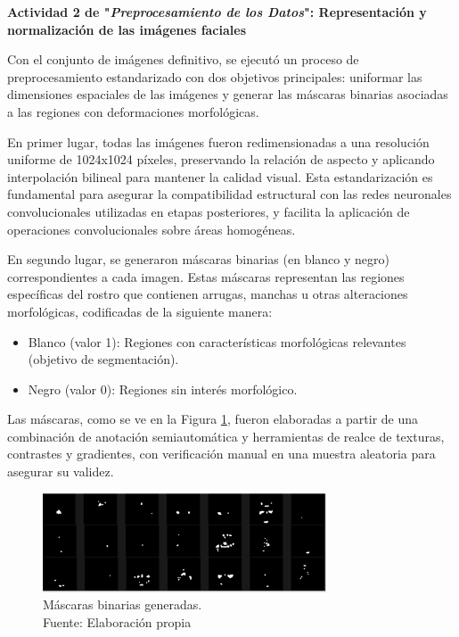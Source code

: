 \textbf{Actividad 2 de "\textit{Preprocesamiento de los Datos}": Representación y normalización de las imágenes faciales}

Con el conjunto de imágenes definitivo, se ejecutó un proceso de preprocesamiento estandarizado con dos objetivos principales: uniformar las dimensiones espaciales de las imágenes y generar las máscaras binarias asociadas a las regiones con deformaciones morfológicas.

En primer lugar, todas las imágenes fueron redimensionadas a una resolución uniforme de 1024x1024 píxeles, preservando la relación de aspecto y aplicando interpolación bilineal para mantener la calidad visual. Esta estandarización es fundamental para asegurar la compatibilidad estructural con las redes neuronales convolucionales utilizadas en etapas posteriores, y facilita la aplicación de operaciones convolucionales sobre áreas homogéneas.

En segundo lugar, se generaron máscaras binarias (en blanco y negro) correspondientes a cada imagen. Estas máscaras representan las regiones específicas del rostro que contienen arrugas, manchas u otras alteraciones morfológicas, codificadas de la siguiente manera:

\begin{itemize}
    \item Blanco (valor 1): Regiones con características morfológicas relevantes (objetivo de segmentación).   
    \item Negro (valor 0): Regiones sin interés morfológico.
\end{itemize} 

Las máscaras, como se ve en la Figura \ref{4:fig2}, fueron elaboradas a partir de una combinación de anotación semiautomática y herramientas de realce de texturas, contrastes y gradientes, con verificación manual en una muestra aleatoria para asegurar su validez.

\begin{figure}[h]
	\begin{center}
		\includegraphics[width=0.75\textwidth]{4/figures/mascaras.png}
		\caption[Máscaras binarias generadas]{Máscaras binarias generadas.\\
		Fuente: Elaboración propia}
		\label{4:fig2}
	\end{center}
\end{figure}

